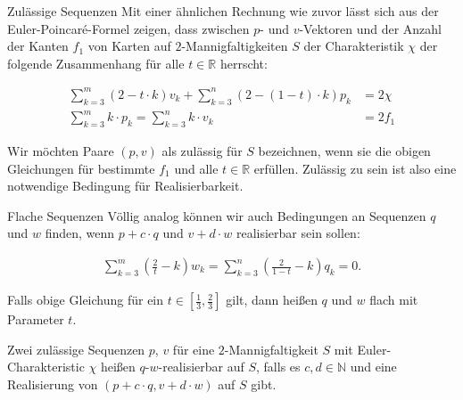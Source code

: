 \documentclass[10pt, notheorems]{beamer}
\newcommand{\nats}{\mathbb{N}}
\newcommand{\reals}{\mathbb{R}}
\newcommand{\hdef}[1]{\textcolor{darkred2}{#1}}
\begin{document}
\begin{frame}{Zulässige Sequenzen}
  Mit einer ähnlichen Rechnung wie zuvor lässt sich aus der {\sc Euler}-{\sc Poincaré}-Formel zeigen, dass zwischen $p$- und $v$-Vektoren und der Anzahl der Kanten $f_1$ von Karten auf $2$-Mannigfaltigkeiten $S$ der Charakteristik $\chi$ der folgende Zusammenhang für alle $t \in \reals$ herrscht:
  \begin{block}{}
    \begin{align*}
      \sum_{k=3}^m (2 - t \cdot k ) v_k + \sum_{k=3}^n ( 2 - (1 - t) \cdot k ) p_k &= 2 \chi\\
      \sum_{k=3}^{m} k \cdot p_k = \sum_{k=3}^{n} k \cdot v_k &= 2f_1
    \end{align*}
  \end{block}
  Wir möchten Paare $(p, v)$ als \hdef{zulässig für $S$} bezeichnen, wenn sie die obigen Gleichungen für bestimmte $f_1$ und alle $t \in \reals$ erfüllen. Zulässig zu sein ist also eine notwendige Bedingung für Realisierbarkeit.
\end{frame}

\begin{frame}{Flache Sequenzen}
  Völlig analog können wir auch Bedingungen an Sequenzen $q$ und $w$ finden, wenn $p+c\cdot q$ und $v+d\cdot w$ realisierbar sein sollen:
  \begin{block}{}
    \begin{align*}
      \sum_{k=3}^m \left(\frac{2}{t} - k \right) w_k = \sum_{k=3}^n \left( \frac{2}{1-t} - k \right) q_k = 0.
    \end{align*}
  \end{block}
  \pause
  Falls obige Gleichung für ein $t \in \left[\tfrac{1}{3}, \tfrac{2}{3}\right]$ gilt, dann heißen $q$ und $w$ \hdef{flach mit Parameter $t$}.
  \pause
  \begin{definition}
    Zwei zulässige Sequenzen $p$, $v$ für eine $2$-Mannigfaltigkeit $S$ mit {\sc Euler}-Charakteristic $\chi$ heißen \hdef{$q$-$w$-realisierbar auf $S$}, falls es $c, d \in \nats$ und eine Realisierung von $(p + c \cdot q, v + d \cdot w)$ auf $S$ gibt.
  \end{definition}
\end{frame}
\end{document}
